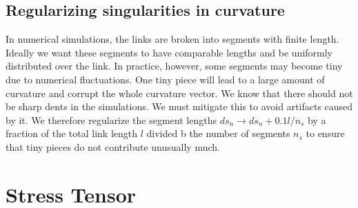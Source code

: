 \documentclass[nofootinbib,preprint,floatfix,titlepage,endfloats,superscriptaddress]{revtex4} %
\begin{document}
\subsection{Regularizing singularities in curvature}
In numerical simulations, the links are broken into segments with finite length. 
Ideally we want these segments to have comparable lengths and be uniformly distributed over the link. 
In practice, however, some segments may become tiny due to numerical fluctuations. 
One tiny piece will lead to a large amount of curvature and corrupt the whole curvature vector. 
We know that there should not be sharp dents in the simulations. %
We must mitigate this to avoid artifacts caused by it. 
We therefore regularize the segment lengths $ds_n\to ds_n+ 0.1 l/n_s$ by a fraction of the total link length $l$ divided b the number of segments $n_s$ to ensure that tiny pieces do not contribute unusually much. 



\section{Stress Tensor\label{ap:stress}}
\end{document}
